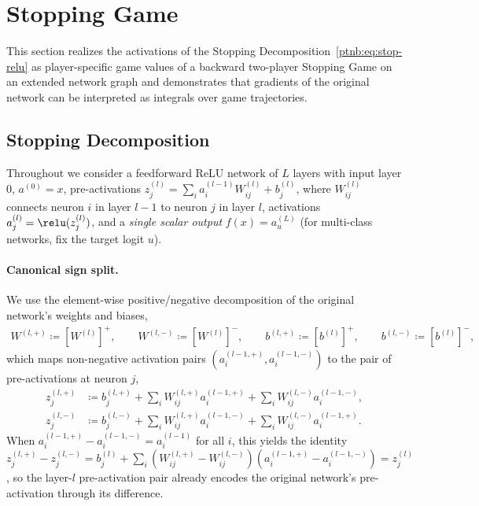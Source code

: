\section{Stopping Game}\label{ptnb:app:relu-net-game}\label{ptnb:app:adf-game}

This section realizes the activations of the Stopping Decomposition~\eqref{ptnb:eq:stop-relu} as
player-specific game values of a backward two-player Stopping Game on an extended network graph and
demonstrates that gradients of the original network can be interpreted as integrals over game
trajectories.

\subsection{Stopping Decomposition}\label{ptnb:app:dc-decomp}\label{ptnb:app:decompositions}

Throughout we consider a feedforward ReLU network of $L$ layers with input layer $0$, $a^{(0)} =
    x$, pre-activations $z_j^{(l)} = \sum_i a_i^{(l-1)} W_{ij}^{(l)} + b_j^{(l)}$, where $W_{ij}^{(l)}$
connects neuron $i$ in layer $l-1$ to neuron $j$ in layer $l$, activations $a_j^{(l)} =
    \relu(z_j^{(l)})$, and a \emph{single scalar output} $f(x) = a_u^{(L)}$ (for multi-class networks,
fix the target logit $u$).

\paragraph{Canonical sign split.}
We use the element-wise positive/negative decomposition of the original network's weights and
biases,
\begin{align}
    W^{(l,+)} \coloneqq [W^{(l)}]^+, \qquad W^{(l,-)} \coloneqq [W^{(l)}]^-, \qquad b^{(l,+)} \coloneqq
    [b^{(l)}]^+, \qquad b^{(l,-)} \coloneqq [b^{(l)}]^-,
\end{align}
which maps non-negative activation pairs $(a_i^{(l-1,+)}, a_i^{(l-1,-)})$ to the pair of
pre-activations at neuron $j$,
\begin{align}
    z_j^{(l,+)} &\coloneqq b_j^{(l,+)} + \sum_i W_{ij}^{(l,+)} a_i^{(l-1,+)} + \sum_i W_{ij}^{(l,-)}
    a_i^{(l-1,-)}, \label{ptnb:eq:split-pos}\\
    z_j^{(l,-)} &\coloneqq b_j^{(l,-)} + \sum_i W_{ij}^{(l,+)} a_i^{(l-1,-)} + \sum_i W_{ij}^{(l,-)}
    a_i^{(l-1,+)}. \label{ptnb:eq:split-neg}
\end{align}
When $a_i^{(l-1,+)} - a_i^{(l-1,-)} = a_i^{(l-1)}$ for all $i$, this yields the identity
$z_j^{(l,+)} - z_j^{(l,-)} = b_j^{(l)} + \sum_i (W_{ij}^{(l,+)} - W_{ij}^{(l,-)}) (a_i^{(l-1,+)} -
    a_i^{(l-1,-)}) = z_j^{(l)}$, so the layer-$l$ pre-activation pair already encodes the original
network's pre-activation through its difference.

